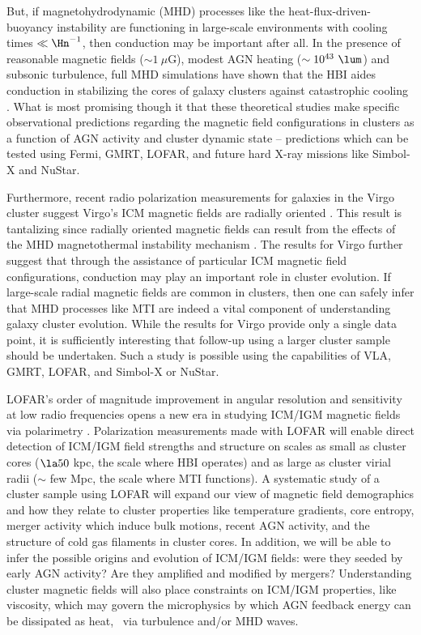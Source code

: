 \documentclass[12pt]{article}
\begin{document}
But, if magnetohydrodynamic (MHD) processes like the
heat-flux-driven-buoyancy instability
\cite[HBI,][]{2008ApJ...677L...9P} are functioning in large-scale
environments with cooling times $\ll \Hn^{-1}$, then conduction may be
important after all. In the presence of reasonable magnetic fields
($\sim 1~\mu$G), modest AGN heating ($\sim 10^{43}~\lum$) and subsonic
turbulence, full MHD simulations have shown that the HBI aides
conduction in stabilizing the cores of galaxy clusters against
catastrophic cooling \cite{2009ApJ...703...96P,
  2009arXiv0911.5198R}. What is most promising though it that these
theoretical studies make specific observational predictions regarding
the magnetic field configurations in clusters as a function of AGN
activity and cluster dynamic state -- predictions which can be tested
using Fermi, GMRT, LOFAR, and future hard X-ray missions like Simbol-X
and NuStar.

Furthermore, recent radio polarization measurements for galaxies in
the Virgo cluster suggest Virgo's ICM magnetic fields are radially
oriented \cite{2009arXiv0911.2476P}. This result is tantalizing since
radially oriented magnetic fields can result from the effects of the
MHD magnetothermal instability mechanism
\cite[MTI,][]{2000ApJ...534..420B}. The results for Virgo further
suggest that through the assistance of particular ICM magnetic field
configurations, conduction may play an important role in cluster
evolution. If large-scale radial magnetic fields are common in
clusters, then one can safely infer that MHD processes like MTI are
indeed a vital component of understanding galaxy cluster
evolution. While the results for Virgo provide only a single data
point, it is sufficiently interesting that follow-up using a larger
cluster sample should be undertaken. Such a study is possible using
the capabilities of VLA, GMRT, LOFAR, and Simbol-X or NuStar.

LOFAR's order of magnitude improvement in angular resolution and
sensitivity at low radio frequencies opens a new era in studying
ICM/IGM magnetic fields via polarimetry
\cite{2009ASPC..407...33A}. Polarization measurements made with LOFAR
will enable direct detection of ICM/IGM field strengths and structure
on scales as small as cluster cores ($\la 50$ kpc, the scale where HBI
operates) and as large as cluster virial radii ($\sim$ few Mpc, the
scale where MTI functions). A systematic study of a cluster sample
using LOFAR will expand our view of magnetic field demographics and
how they relate to cluster properties like temperature gradients, core
entropy, merger activity which induce bulk motions, recent AGN
activity, and the structure of cold gas filaments in cluster cores. In
addition, we will be able to infer the possible origins and evolution
of ICM/IGM fields: were they seeded by early AGN activity? Are they
amplified and modified by mergers? Understanding cluster magnetic
fields will also place constraints on ICM/IGM properties, like
viscosity, which may govern the microphysics by which AGN feedback
energy can be dissipated as heat, \eg\ via turbulence and/or MHD
waves.
\end{document}
